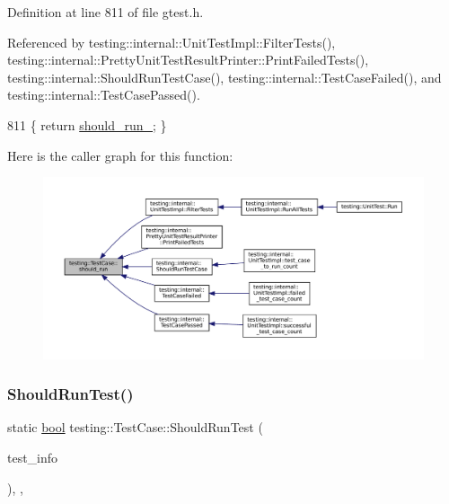 Definition at line 811 of file gtest.\+h.



Referenced by testing\+::internal\+::\+Unit\+Test\+Impl\+::\+Filter\+Tests(), testing\+::internal\+::\+Pretty\+Unit\+Test\+Result\+Printer\+::\+Print\+Failed\+Tests(), testing\+::internal\+::\+Should\+Run\+Test\+Case(), testing\+::internal\+::\+Test\+Case\+Failed(), and testing\+::internal\+::\+Test\+Case\+Passed().


\begin{DoxyCode}
811 \{ \textcolor{keywordflow}{return} \hyperlink{classtesting_1_1TestCase_a2f98fefe1f624c879e0320882c561d85}{should\_run\_}; \}
\end{DoxyCode}
Here is the caller graph for this function\+:
\nopagebreak
\begin{figure}[H]
\begin{center}
\leavevmode
\includegraphics[width=350pt]{classtesting_1_1TestCase_a843d6cd43f3e587bfa8681990b9d59df_icgraph}
\end{center}
\end{figure}
\mbox{\label{classtesting_1_1TestCase_a75eb139557c43362f94916cfd6762c94}} 
\subsubsection{\texorpdfstring{Should\+Run\+Test()}{ShouldRunTest()}}
{\footnotesize\ttfamily static \hyperlink{classbool}{bool} testing\+::\+Test\+Case\+::\+Should\+Run\+Test (\begin{DoxyParamCaption}\item[{const \hyperlink{classtesting_1_1TestInfo}{Test\+Info} $\ast$}]{test\+\_\+info }\end{DoxyParamCaption})\hspace{0.3cm}{\ttfamily [inline]}, {\ttfamily [static]}, {\ttfamily [private]}}



